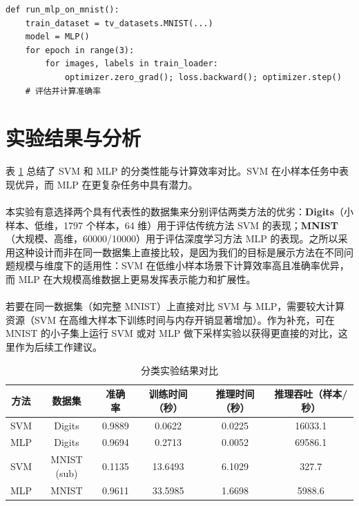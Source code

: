 \begin{lstlisting}[style=cleanpython]
def run_mlp_on_mnist():
    train_dataset = tv_datasets.MNIST(...)
    model = MLP()
    for epoch in range(3):
        for images, labels in train_loader:
            optimizer.zero_grad(); loss.backward(); optimizer.step()
    # 评估并计算准确率
\end{lstlisting}

\section{实验结果与分析}

表 \ref{tab:classification_results} 总结了 SVM 和 MLP 的分类性能与计算效率对比。SVM 在小样本任务中表现优异，而 MLP 在更复杂任务中具有潜力。

\paragraph{} 本实验有意选择两个具有代表性的数据集来分别评估两类方法的优劣：\textbf{Digits}（小样本、低维，1797 个样本，64 维）用于评估传统方法 SVM 的表现；\textbf{MNIST}（大规模、高维，60000/10000）用于评估深度学习方法 MLP 的表现。之所以采用这种设计而非在同一数据集上直接比较，是因为我们的目标是展示方法在不同问题规模与维度下的适用性：SVM 在低维小样本场景下计算效率高且准确率优异，而 MLP 在大规模高维数据上更易发挥表示能力和扩展性。

\paragraph{} 若要在同一数据集（如完整 MNIST）上直接对比 SVM 与 MLP，需要较大计算资源（SVM 在高维大样本下训练时间与内存开销显著增加）。作为补充，可在 MNIST 的小子集上运行 SVM 或对 MLP 做下采样实验以获得更直接的对比，这里作为后续工作建议。

\begin{table}[htbp]
    \centering
    \caption{分类实验结果对比}
    \label{tab:classification_results}
    \begin{tabular}{|c|c|c|c|c|c|}
        \hline
        方法 & 数据集 & 准确率 & 训练时间（秒） & 推理时间（秒） & 推理吞吐（样本/秒） \\
        \hline
        SVM & Digits & 0.9889 & 0.0622 & 0.0225 & 16033.1 \\
        \hline
        MLP & Digits & 0.9694 & 0.2713 & 0.0052 & 69586.1 \\
        \hline
        SVM & MNIST (sub) & 0.1135 & 13.6493 & 6.1029 & 327.7 \\
        \hline
        MLP & MNIST & 0.9611 & 33.5985 & 1.6698 & 5988.6 \\
        \hline
    \end{tabular}
\end{table}

